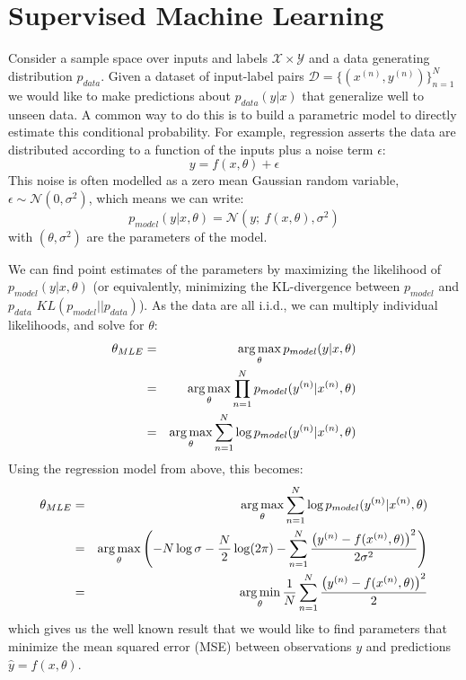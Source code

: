 \section{Supervised Machine Learning}
Consider a sample space over inputs and labels $\mathcal{X} \times \mathcal{Y}$
and a data generating distribution $p_{data}$. Given a dataset of input-label
pairs $\mathcal{D} = \{(x^{(n)}, y^{(n)})\}_{n=1}^N$ we would like to make
predictions about $p_{data}(y|x)$ that generalize well to unseen data. A common
way to do this is to build a parametric model to directly estimate this
conditional probability.  For example, regression asserts the data are
distributed according to a function of the inputs plus a noise term $\epsilon$:
\begin{equation}
  y = f(x, \theta) + \epsilon
\end{equation}
This noise is often modelled as a zero mean Gaussian random variable, $\epsilon
\sim \mathcal{N}(0, \sigma^2)$, which means we can write:
\begin{equation}\label{eq:ch2:regression}
  p_{model}(y|x, \theta) = \mathcal{N}(y;\ f(x, \theta), \sigma^2)
\end{equation}
with $(\theta, \sigma^2)$ are the parameters of the model. 

We can find point estimates of the parameters by maximizing the likelihood of
$p_{model}(y|x, \theta)$ (or equivalently, minimizing the KL-divergence between
$p_{model}$ and $p_{data}$ $KL(p_{model}||p_{data})$). As the data are all
i.i.d., we can multiply individual likelihoods, and solve for $\theta$:
\begin{eqnarray}
  \theta_{MLE} &=& \operatorname*{arg\,max}_{\theta} p_{model}(y|x, \theta) \\
              &=& \operatorname*{arg\,max}_{\theta} \prod_{n=1}^{N} p_{model}(y^{(n)}|x^{(n)}, \theta) \\
              &=& \operatorname*{arg\,max}_{\theta} \sum_{n=1}^N \log p_{model}(y^{(n)}|x^{(n)}, \theta)
\end{eqnarray}
Using the regression model from above, this becomes:
\begin{eqnarray} 
  \theta_{MLE} &=& \operatorname*{arg\,max}_{\theta} \sum_{n=1}^N \log p_{model}(y^{(n)}|x^{(n)}, \theta) \\
              &=& \operatorname*{arg\,max}_{\theta} \left(-N\log \sigma - \frac{N}{2}\log (2\pi) - \sum_{n=1}^{N}
                  \frac{\left(y^{(n)} - f(x^{(n)}, \theta)\right)^2}{2\sigma^2}\right) \\
                  &=& \operatorname*{arg\,min}_{\theta}\frac{1}{N}\sum_{n=1}^{N} \frac{\left(y^{(n)} - f(x^{(n)}, \theta)\right)^2}{2} \label{eq:ch2:mle_reg}
\end{eqnarray}
which gives us the well known result that we would like to find parameters that
minimize the mean squared error (MSE) between observations $y$ and predictions
$\hat{y} = f(x, \theta)$.

